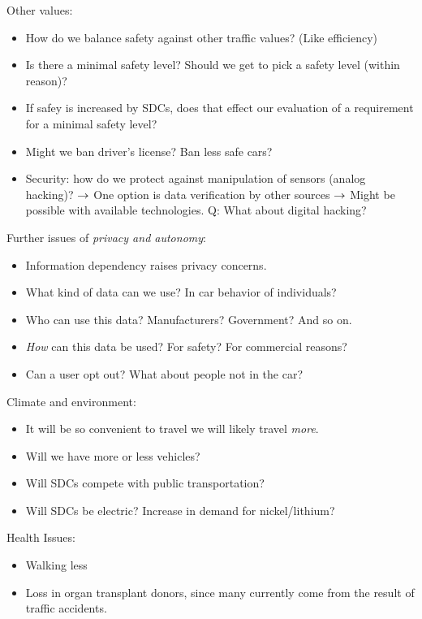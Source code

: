 Other values:
\begin{itemize}
    \item How do we balance safety against other traffic values? (Like efficiency)
    \item Is there a minimal safety level? Should we get to pick a safety level (within reason)?
    \item If safey is increased by SDCs, does that effect our evaluation of a requirement for a minimal safety level?
    \item Might we ban driver's license? Ban less safe cars?
    \item Security: how do we protect against manipulation of sensors (analog hacking)?
    $\rightarrow$ One option is data verification by other sources
    $\rightarrow$ Might be possible with available technologies.
    Q: What about digital hacking? 
\end{itemize}

Further issues of {\it privacy and autonomy}:
\begin{itemize}
    \item Information dependency raises privacy concerns.
    \item What kind of data can we use? In car behavior of individuals?
    \item Who can use this data? Manufacturers? Government? And so on.
    \item {\it How} can this data be used? For safety? For commercial reasons?
    \item Can a user opt out? What about people not in the car?
\end{itemize}

Climate and environment:
\begin{itemize}
    \item It will be so convenient to travel we will likely travel {\it more}.
    \item Will we have more or less vehicles?
    \item Will SDCs compete with public transportation?
    \item Will SDCs be electric? Increase in demand for nickel/lithium?
\end{itemize}

Health Issues:
\begin{itemize}
    \item Walking less
    \item Loss in organ transplant donors, since many currently come from the result of traffic accidents.
\end{itemize}

